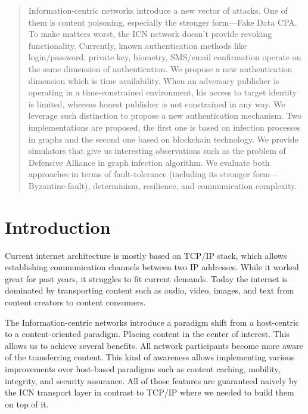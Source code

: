 \documentclass[nostrict]{szablonPG}
\begin{document}
\tableofcontents
\listoffigures

\begin{abstract}
Information-centric networks introduce a new vector of attacks. One of them is content poisoning, especially the stronger form––Fake Data CPA. To make matters worst, the ICN network doesn't provide revoking functionality. Currently, known authentication methods like login/password, private key, biometry, SMS/email confirmation operate on the same dimension of authentication. We propose a new authentication dimension which is time availability. When an adversary publisher is operating in a time-constrained environment, his access to target identity is limited, whereas honest publisher is not constrained in any way. We leverage such distinction to propose a new authentication mechanism.
Two implementations are proposed, the first one is based on infection processes in graphs and the second one based on blockchain technology. We provide simulators that give us interesting observations such as the problem of Defensive Alliance in graph infection algorithm. We evaluate both approaches in terms of fault-tolerance (including its stronger form––Byzantine-fault), determinism, resilience, and communication complexity.

\end{abstract}


\section{Introduction}
Current internet architecture is mostly based on TCP/IP stack, which allows establishing communication channels between two IP addresses. While it worked great for past years, it struggles to fit current demands. Today the internet is dominated by transporting content such as audio, video, images, and text from content creators to content consumers. 

The Information-centric networks introduce a paradigm shift from a host-centric to a content-oriented paradigm. Placing content in the center of interest. This allows us to achieve several benefits. All network participants become more aware of the transferring content. This kind of awareness allows implementing various improvements over host-based paradigms such as content caching, mobility, integrity, and security assurance. All of those features are guaranteed naively by the ICN transport layer in contrast to TCP/IP where we needed to build them on top of it. 
\end{document}
